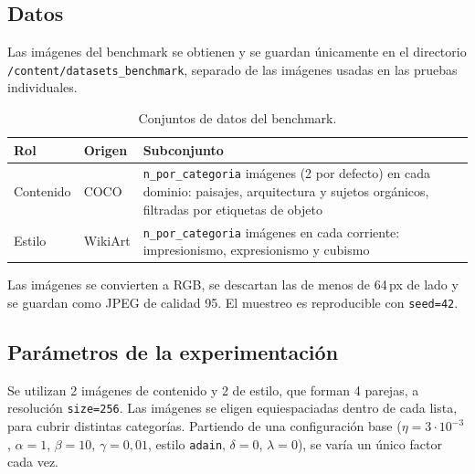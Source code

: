 \documentclass[a4paper]{article}
\begin{document}
\subsection{Datos}

\noindent Las imágenes del benchmark se obtienen y se guardan únicamente en el directorio \texttt{/content/datasets\_benchmark}, separado de las imágenes usadas en las pruebas individuales.

\begin{table}[h]
\centering
\begin{tabularx}{\textwidth}{|l|X|X|}
\hline
\textbf{Rol} & \textbf{Origen} & \textbf{Subconjunto} \\
\hline
Contenido & COCO  & \texttt{n\_por\_categoria} imágenes (2 por defecto) en cada dominio: paisajes, arquitectura y sujetos orgánicos, filtradas por etiquetas de objeto \\
\hline
Estilo & WikiArt & \texttt{n\_por\_categoria} imágenes en cada corriente: impresionismo, expresionismo y cubismo \\
\hline
\end{tabularx}
\caption{Conjuntos de datos del benchmark.}
\end{table}

\noindent Las imágenes se convierten a RGB, se descartan las de menos de 64\,px de lado y se guardan como JPEG de calidad 95. El muestreo es reproducible con \texttt{seed=42}.

\subsection{Parámetros de la experimentación}

\noindent Se utilizan 2 imágenes de contenido y 2 de estilo, que forman 4 parejas, a resolución \texttt{size=256}. Las imágenes se eligen equiespaciadas dentro de cada lista, para cubrir distintas categorías. Partiendo de una configuración base ($\eta=3\cdot10^{-3}$, $\alpha=1$, $\beta=10$, $\gamma=0{,}01$, estilo \texttt{adain}, $\delta=0$, $\lambda=0$), se varía un único factor cada vez.
\end{document}
